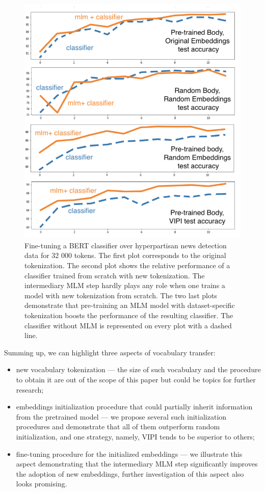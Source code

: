 \documentclass[review]{elsarticle}
\begin{document}
\begin{figure}[h]
\centering
     \includegraphics[scale=0.6]{CLF4.png}
  \caption{Fine-tuning a BERT classifier over hyperpartisan news detection data for 32 000 tokens. The first plot corresponds to the original tokenization. The second plot shows the relative performance of a classifier trained from scratch with new tokenization. The intermediary MLM step hardly plays any role when one trains a model with new tokenization from scratch. The two last plots demonstrate that pre-training an MLM model with dataset-specific tokenization boosts the performance of the resulting classifier. The classifier without MLM is represented on every plot with a dashed line.}
  \label{fig:clf}
\end{figure}

Summing up, we can highlight three aspects of vocabulary transfer:
\begin{itemize}
    \item new vocabulary tokenization — the size of such vocabulary and the procedure to obtain it are out of the scope of this paper but could be topics for further research;
    \item embeddings initialization procedure that could partially inherit information from the pretrained model — we propose several such initialization procedures and demonstrate that all of them outperform random initialization, and one strategy, namely, VIPI tends to be superior to others; 
    \item fine-tuning procedure for the initialized embeddings — we illustrate this aspect demonstrating that the intermediary MLM step significantly improves the adoption of new embeddings, further investigation of this aspect also looks promising.
\end{itemize}
\end{document}
